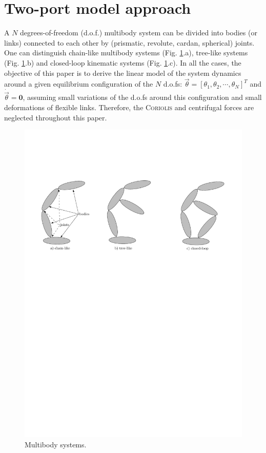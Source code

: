 \documentclass[smallcondensed]{svjour3}     %
\begin{document}
\section{Two-port model approach}\label{sect:1}
A $N$ degrees-of-freedom (d.o.f.) multibody system can be divided into bodies (or links) connected to each other by (prismatic, revolute, cardan, spherical) joints. One can distinguish chain-like multibody systems (Fig. \ref{fig:SerieTreeClosed}.a), tree-like systems  (Fig. \ref{fig:SerieTreeClosed}.b) and closed-loop kinematic systems  (Fig. \ref{fig:SerieTreeClosed}.c). In all the cases, the objective of this paper is to derive the linear model of the system dynamics around a given equilibrium configuration of the $N$ d.o.fs: $\vec{\theta}=[\theta_1,\theta_2,\cdots,\theta_N]^T$ and  $\dot{\vec{\theta}}=\mathbf{0}$, assuming small variations of the d.o.fs around this configuration and small deformations of flexible links. Therefore, the \textsc{Coriolis} and centrifugal forces are neglected throughout this paper.
\begin{figure}[htbp!]
  \includegraphics[width=1.\textwidth]{SerieTreeClosed}
\caption{Multibody systems.}
\label{fig:SerieTreeClosed} 
\end{figure}
\end{document}
